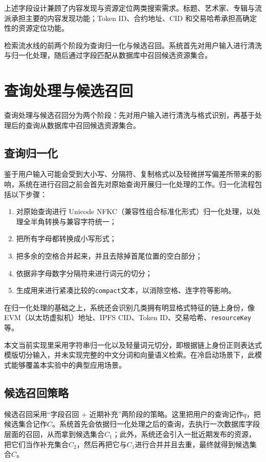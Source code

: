 上述字段设计兼顾了内容发现与资源定位两类搜索需求。标题、艺术家、专辑与流派承担主要的内容发现功能；Token ID、合约地址、CID 和交易哈希承担高确定性的资源定位功能。

检索流水线的前两个阶段为查询归一化与候选召回。系统首先对用户输入进行清洗与归一化处理，随后通过字段匹配从数据库中召回候选资源集合。

\section{查询处理与候选召回}

查询处理与候选召回分为两个阶段：先对用户输入进行清洗与格式识别，再基于处理后的查询从数据库中召回候选资源集合。

\subsection{查询归一化}

鉴于用户输入可能会受到大小写、分隔符、复制格式以及轻微拼写偏差所带来的影响，系统在进行召回之前会首先对原始查询开展归一化处理的工作。归一化流程包括以下步骤：

\begin{enumerate}
    \item 对原始查询进行 Unicode NFKC（兼容性组合标准化形式）归一化处理，以处理全半角转换与兼容字符统一；
    \item 把所有字母都转换成小写形式；
    \item 把多余的空格合并起来，并且去除掉首尾位置的空白部分；
    \item 依据非字母数字分隔符来进行词元的切分；
    \item 生成用来进行紧凑比较的\texttt{compact}文本，以消除空格、连字符等影响。
\end{enumerate}

在归一化处理的基础之上，系统还会识别几类拥有明显格式特征的链上身份，像 EVM（以太坊虚拟机）地址、IPFS CID、Token ID、交易哈希、\texttt{resourceKey}等。

本文当前实现里采用字符串归一化以及轻量词元切分，即根据链上身份正则表达式模版切分输入，并未实现完整的中文分词和向量语义检索。在冷启动场景下，此模式能够覆盖本实验中的典型应用场景。

\subsection{候选召回策略}

候选召回采用“字段召回 + 近期补充”两阶段的策略。这里把用户的查询记作$q$，把候选集合记作$C$。系统首先会依据归一化处理之后的查询，去执行一次数据库字段层面的召回，从而拿到候选集合$C_1$；此外，系统还会引入一批近期发布的资源，把它们当作补充集合$C_2$，然后再把它与$C_1$进行合并并且去重，最终就得到候选集合$C$。

